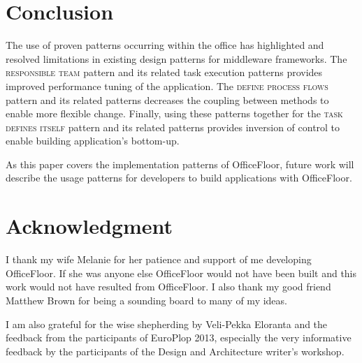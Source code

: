 \documentclass[prodmode]{style/acmlarge}
\begin{document}
\section{Conclusion}

The use of proven patterns occurring within the office has highlighted and
resolved limitations in existing design patterns for middleware frameworks.  The
\textsc{responsible team} pattern and its related task execution patterns
provides improved performance tuning of the application.  The \textsc{define
process flows} pattern and its related patterns decreases the coupling between
methods to enable more flexible change.  Finally, using these patterns together
for the \textsc{task defines itself} pattern and its related patterns provides
inversion of control to enable building application's bottom-up.

As this paper covers the implementation patterns of OfficeFloor, future work
will describe the usage patterns for developers to build applications with
OfficeFloor.



\section*{Acknowledgment} 

I thank my wife Melanie for her patience and support of me developing
OfficeFloor.  If she was anyone else OfficeFloor would not have been built and
this work would not have resulted from OfficeFloor.  I also thank my good friend
Matthew Brown for being a sounding board to many of my ideas.

I am also grateful for the wise shepherding by Veli-Pekka Eloranta and the
feedback from the participants of EuroPlop 2013, especially the very informative
feedback by the participants of the Design and Architecture writer's workshop.




\end{document}
